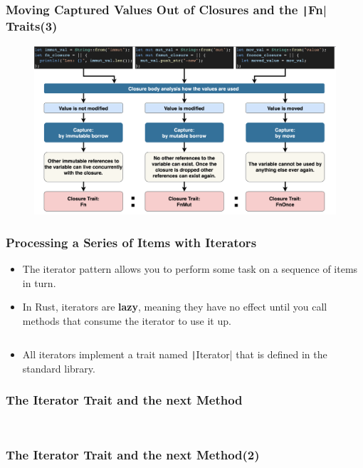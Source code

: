 \documentclass{beamer}
\begin{document}
\begin{frame}[fragile]
	\frametitle{Moving Captured Values Out of Closures and the \texttt|Fn| Traits(3)}
\begin{figure}
	\centering
	\includegraphics[width=1\linewidth]{img/closure.png}
\end{figure}

\end{frame}

\begin{frame}[fragile]
	\frametitle{Processing a Series of Items with Iterators}
	\begin{itemize}
		\item The iterator pattern allows you to perform some task on a sequence of items in turn.
		\item 	In Rust, iterators are \textbf{lazy}, meaning they have no effect until you call methods that consume the iterator to use it up. 
		\inputminted{rust}{./code/iterator.rs}
		\item 	All iterators implement a trait named \texttt|Iterator| that is defined in the standard library.
	\end{itemize}


\end{frame}

\begin{frame}[fragile]
	\frametitle{The Iterator Trait and the next Method}
	\inputminted[fontsize=\scriptsize]{rust}{./code/iterator2.rs}
	
		\inputminted[fontsize=\scriptsize]{rust}{./code/iterator3.rs}
\end{frame}

\begin{frame}[fragile]
	\frametitle{The Iterator Trait and the next Method(2)}
	\inputminted[fontsize=\scriptsize]{rust}{./code/iterator3.rs}
\end{frame}
\end{document}
